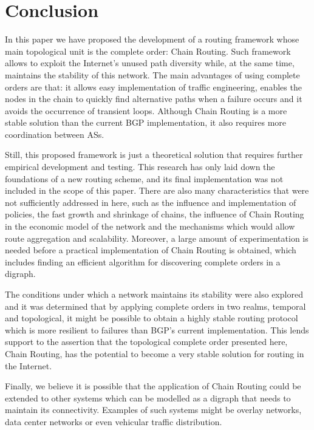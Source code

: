 \documentclass[5p,twocolumn]{elsarticle}
\begin{document}
\section{Conclusion}\label{conclusion}

In this paper we have proposed the development of a routing framework whose main topological unit is the complete order: Chain Routing. Such framework allows to exploit the Internet's unused path diversity while, at the same time, maintains the stability of this network. The main advantages of using complete orders are that: it allows easy implementation of traffic engineering, enables the nodes in the chain to quickly find alternative paths when a failure occurs and it avoids the occurrence of transient loops. Although Chain Routing is a more stable solution than the current BGP implementation, it also requires more coordination between ASs.

Still, this proposed framework is just a theoretical solution that requires further empirical development and testing. This research has only laid down the foundations of a new routing scheme, and its final implementation was not included in the scope of this paper. There are also many characteristics that were not sufficiently addressed in here, such as the influence and implementation of policies, the fast growth and shrinkage of chains, the influence of Chain Routing in the economic model of the network and the mechanisms which would allow route aggregation and scalability. Moreover, a large amount of experimentation is needed before a practical implementation of Chain Routing is obtained, which includes finding an efficient algorithm for discovering complete orders in a digraph.



The conditions under which a network maintains its stability were also explored and it was determined that by applying complete orders in two realms, temporal and topological, it might be possible to obtain a highly stable routing protocol which is more resilient to failures than BGP's current implementation. This lends support to the assertion that the topological complete order presented here, Chain Routing, has the potential to become a very stable solution for routing in the Internet.

Finally, we believe it is possible that the application of Chain Routing could be extended to other systems which can be modelled as a digraph that needs to maintain its connectivity. Examples of such systems might be overlay networks, data center networks or even vehicular traffic distribution.





\end{document}
